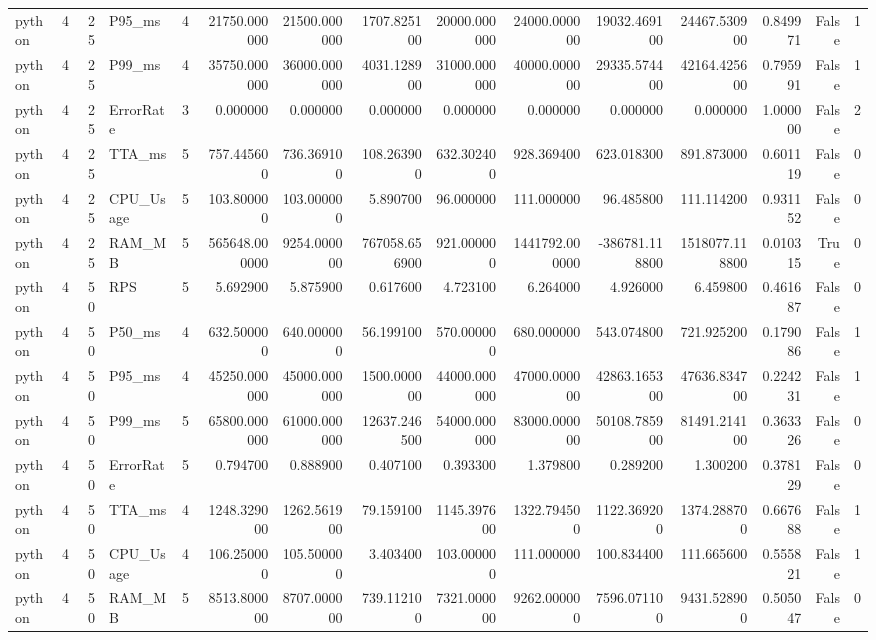 \begin{tabular}{lrrlrrrrrrrrrrr}
python & 4 & 25 & P95_ms & 4 & 21750.000000 & 21500.000000 & 1707.825100 & 20000.000000 & 24000.000000 & 19032.469100 & 24467.530900 & 0.849971 & False & 1 \\
python & 4 & 25 & P99_ms & 4 & 35750.000000 & 36000.000000 & 4031.128900 & 31000.000000 & 40000.000000 & 29335.574400 & 42164.425600 & 0.795991 & False & 1 \\
python & 4 & 25 & ErrorRate & 3 & 0.000000 & 0.000000 & 0.000000 & 0.000000 & 0.000000 & 0.000000 & 0.000000 & 1.000000 & False & 2 \\
python & 4 & 25 & TTA_ms & 5 & 757.445600 & 736.369100 & 108.263900 & 632.302400 & 928.369400 & 623.018300 & 891.873000 & 0.601119 & False & 0 \\
python & 4 & 25 & CPU_Usage & 5 & 103.800000 & 103.000000 & 5.890700 & 96.000000 & 111.000000 & 96.485800 & 111.114200 & 0.931152 & False & 0 \\
python & 4 & 25 & RAM_MB & 5 & 565648.000000 & 9254.000000 & 767058.656900 & 921.000000 & 1441792.000000 & -386781.118800 & 1518077.118800 & 0.010315 & True & 0 \\
python & 4 & 50 & RPS & 5 & 5.692900 & 5.875900 & 0.617600 & 4.723100 & 6.264000 & 4.926000 & 6.459800 & 0.461687 & False & 0 \\
python & 4 & 50 & P50_ms & 4 & 632.500000 & 640.000000 & 56.199100 & 570.000000 & 680.000000 & 543.074800 & 721.925200 & 0.179086 & False & 1 \\
python & 4 & 50 & P95_ms & 4 & 45250.000000 & 45000.000000 & 1500.000000 & 44000.000000 & 47000.000000 & 42863.165300 & 47636.834700 & 0.224231 & False & 1 \\
python & 4 & 50 & P99_ms & 5 & 65800.000000 & 61000.000000 & 12637.246500 & 54000.000000 & 83000.000000 & 50108.785900 & 81491.214100 & 0.363326 & False & 0 \\
python & 4 & 50 & ErrorRate & 5 & 0.794700 & 0.888900 & 0.407100 & 0.393300 & 1.379800 & 0.289200 & 1.300200 & 0.378129 & False & 0 \\
python & 4 & 50 & TTA_ms & 4 & 1248.329000 & 1262.561900 & 79.159100 & 1145.397600 & 1322.794500 & 1122.369200 & 1374.288700 & 0.667688 & False & 1 \\
python & 4 & 50 & CPU_Usage & 4 & 106.250000 & 105.500000 & 3.403400 & 103.000000 & 111.000000 & 100.834400 & 111.665600 & 0.555821 & False & 1 \\
python & 4 & 50 & RAM_MB & 5 & 8513.800000 & 8707.000000 & 739.112100 & 7321.000000 & 9262.000000 & 7596.071100 & 9431.528900 & 0.505047 & False & 0 \\

\end{tabular}
